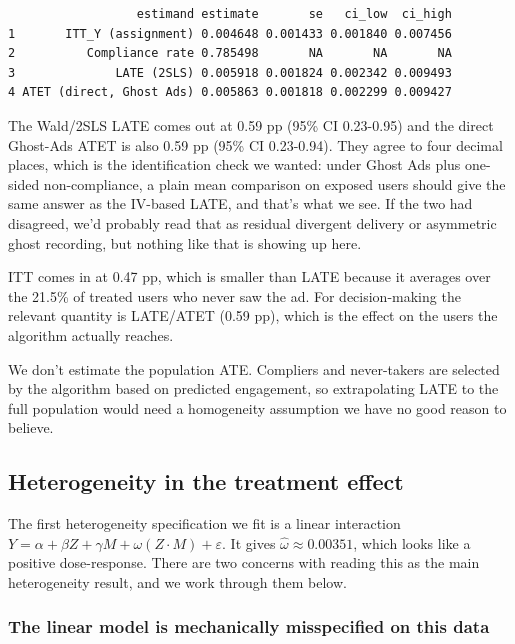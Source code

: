 \begin{verbatim}
                  estimand estimate       se   ci_low  ci_high
1       ITT_Y (assignment) 0.004648 0.001433 0.001840 0.007456
2          Compliance rate 0.785498       NA       NA       NA
3              LATE (2SLS) 0.005918 0.001824 0.002342 0.009493
4 ATET (direct, Ghost Ads) 0.005863 0.001818 0.002299 0.009427
\end{verbatim}

The Wald/2SLS LATE comes out at 0.59 pp (95\% CI 0.23-0.95) and the
direct Ghost-Ads ATET is also 0.59 pp (95\% CI 0.23-0.94). They agree to
four decimal places, which is the identification check we wanted: under
Ghost Ads plus one-sided non-compliance, a plain mean comparison on
exposed users should give the same answer as the IV-based LATE, and
that's what we see. If the two had disagreed, we'd probably read that as
residual divergent delivery or asymmetric ghost recording, but nothing
like that is showing up here.

ITT comes in at 0.47 pp, which is smaller than LATE because it averages
over the 21.5\% of treated users who never saw the ad. For
decision-making the relevant quantity is LATE/ATET (0.59 pp), which is
the effect on the users the algorithm actually reaches.

We don't estimate the population ATE. Compliers and never-takers are
selected by the algorithm based on predicted engagement, so
extrapolating LATE to the full population would need a homogeneity
assumption we have no good reason to believe.

\subsection{Heterogeneity in the treatment effect}

The first heterogeneity specification we fit is a linear interaction
\(Y = \alpha + \beta Z + \gamma M + \omega (Z \cdot M) + \varepsilon\).
It gives \(\hat\omega \approx 0.00351\), which looks like a positive
dose-response. There are two concerns with reading this as the main
heterogeneity result, and we work through them below.

\subsubsection{The linear model is mechanically misspecified on this data}

\begin{Shaded}
\begin{Highlighting}[]
\OtherTok{\textless{}{-}} \SpecialCharTok{\textasciitilde{}}\SpecialCharTok{*}
\NormalTok{(}\SpecialCharTok{$}\NormalTok{)}
\end{Highlighting}
\end{Shaded}

